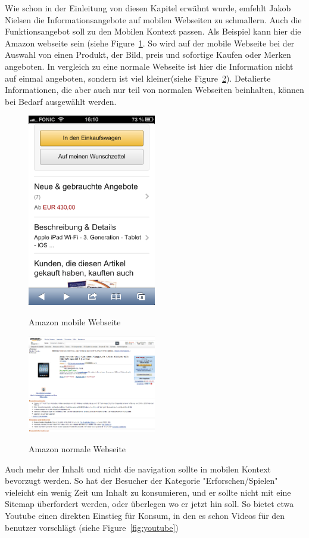 Wie schon in der Einleitung von diesen Kapitel erwähnt wurde, emfehlt Jakob Nielsen die Informationsangebote auf mobilen Webseiten zu schmallern. Auch die Funktionsangebot soll zu den Mobilen Kontext passen. Als Beispiel kann hier die Amazon webseite sein (siehe Figure~\ref{fig:amazon}. So wird auf der mobile Webseite bei der Auswahl von einen Produkt, der Bild, preis und sofortige Kaufen oder Merken angeboten. In vergleich zu eine normale Webseite ist hier die Information nicht auf einmal angeboten, sondern ist viel kleiner(siehe Figure~\ref{fig:amazonFull}). Detalierte Informationen, die aber auch nur teil von normalen Webseiten beinhalten, können bei Bedarf ausgewählt werden. 

\begin{figure}[h]
	\caption{Amazon mobile Webseite}
	\includegraphics[width=0.5\textwidth]{img/amazon.png}
	\label{fig:amazon}
\end{figure}

\begin{figure}[h]
	\caption{Amazon normale Webseite}
	\includegraphics[width=0.5\textwidth]{img/amazonFull.png}
	\label{fig:amazonFull}
\end{figure}
Auch mehr der Inhalt und nicht die navigation sollte in mobilen Kontext bevorzugt werden\cite[Seite 52]{mobileFirst}. So hat der Besucher der Kategorie "Erforschen/Spielen" vieleicht ein wenig Zeit um Inhalt zu konsumieren, und er sollte nicht mit eine Sitemap überfordert werden, oder überlegen wo er jetzt hin soll. So bietet etwa Youtube einen direkten Einstieg für Konsum, in den es schon Videos für den benutzer vorschlägt (siehe Figure~\ref{fig:youtube})

